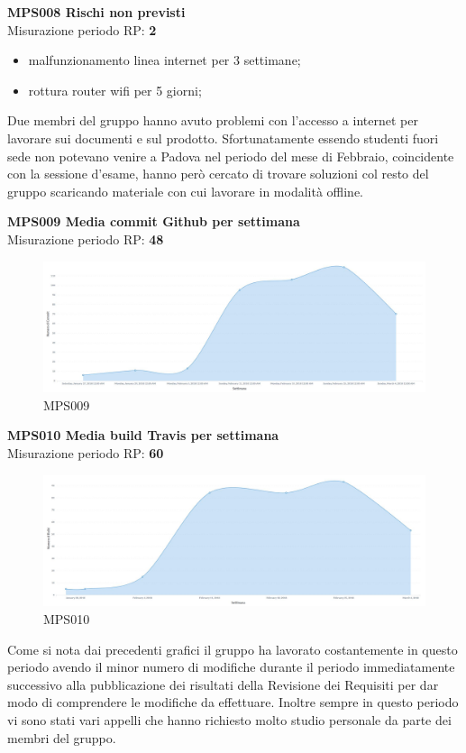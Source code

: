 \documentclass[PianoDiQualifica.tex]{subfiles}
\begin{document}
\textbf{MPS008 Rischi non previsti}\\
Misurazione periodo RP: \textbf{2}
\begin{itemize}
	\item malfunzionamento linea internet \Davide per 3 settimane;
	\item rottura router wifi \Elena per 5 giorni;
\end{itemize}
Due membri del gruppo hanno avuto problemi con l'accesso a internet per lavorare sui documenti e sul prodotto. Sfortunatamente essendo studenti fuori sede non potevano venire a Padova nel periodo del mese di Febbraio, coincidente con la sessione d'esame, hanno però cercato di trovare soluzioni col resto del gruppo scaricando materiale con cui lavorare in modalità offline.

\newpage

\textbf{MPS009 Media commit Github per settimana}\\
Misurazione periodo RP: \textbf{48}
\begin{figure}[H]
	\centering
	\includegraphics[width=1\linewidth]{RP/MPS009}
	\caption{MPS009}
	\label{fig:processi}
\end{figure}

\textbf{MPS010 Media build Travis per settimana}\\
Misurazione periodo RP: \textbf{60}
\begin{figure}[H]
	\centering
	\includegraphics[width=1\linewidth]{RP/MPS010}
	\caption{MPS010}
	\label{fig:processi}
\end{figure}

Come si nota dai precedenti grafici il gruppo ha lavorato costantemente in questo periodo avendo il minor numero di modifiche durante il periodo immediatamente successivo alla pubblicazione dei risultati della Revisione dei Requisiti per dar modo di comprendere le modifiche da effettuare.
Inoltre sempre in questo periodo vi sono stati vari appelli che hanno richiesto molto studio personale da parte dei membri del gruppo.
\end{document}
